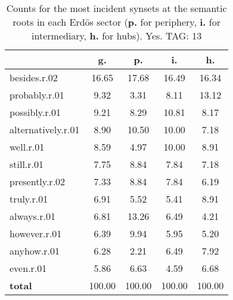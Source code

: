 \begin{table}[h!]
\begin{center}
\begin{tabular}{| l || c | c | c | c |}\hline
 & {\bf g.} & {\bf p.} & {\bf i.} & {\bf h.} \\\hline\hline
besides.r.02 & 16.65  & 17.68  & 16.49  & 16.34 \\\hline
probably.r.01 & 9.32  & 3.31  & 8.11  & 13.12 \\\hline
possibly.r.01 & 9.21  & 8.29  & 10.81  & 8.17 \\\hline
alternatively.r.01 & 8.90  & 10.50  & 10.00  & 7.18 \\\hline
well.r.01 & 8.59  & 4.97  & 10.00  & 8.91 \\\hline
still.r.01 & 7.75  & 8.84  & 7.84  & 7.18 \\\hline
presently.r.02 & 7.33  & 8.84  & 7.84  & 6.19 \\\hline
truly.r.01 & 6.91  & 5.52  & 5.41  & 8.91 \\\hline
always.r.01 & 6.81  & 13.26  & 6.49  & 4.21 \\\hline
however.r.01 & 6.39  & 9.94  & 5.95  & 5.20 \\\hline
anyhow.r.01 & 6.28  & 2.21  & 6.49  & 7.92 \\\hline
even.r.01 & 5.86  & 6.63  & 4.59  & 6.68 \\\hline\hline
{{\bf total}} & 100.00  & 100.00  & 100.00  & 100.00 \\\hline
\end{tabular}
\caption{Counts for the most incident synsets at the semantic roots in each Erd\"os sector ({\bf p.} for periphery, {\bf i.} for intermediary, {\bf h.} for hubs). Yes. TAG: 13}
\end{center}
\end{table}